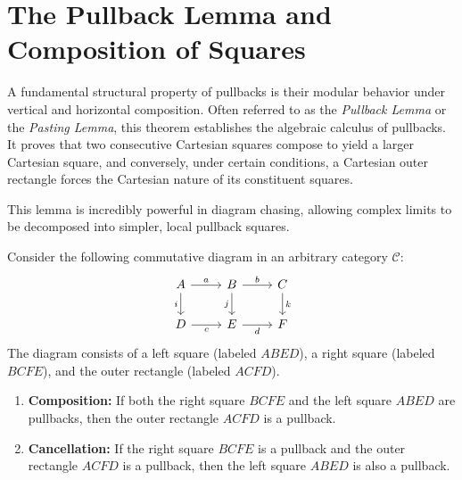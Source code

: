 \section{The Pullback Lemma and Composition of Squares}

A fundamental structural property of pullbacks is their modular behavior under vertical and horizontal composition. Often referred to as the \emph{Pullback Lemma} or the \emph{Pasting Lemma}, this theorem establishes the algebraic calculus of pullbacks. It proves that two consecutive Cartesian squares compose to yield a larger Cartesian square, and conversely, under certain conditions, a Cartesian outer rectangle forces the Cartesian nature of its constituent squares. 

This lemma is incredibly powerful in diagram chasing, allowing complex limits to be decomposed into simpler, local pullback squares.

\begin{theorem}
\label{thm:pasting_lemma}
Consider the following commutative diagram in an arbitrary category $\mathcal{C}$:
\begin{equation}
\label{eq:pasting_diagram}
\begin{tikzcd}
A \arrow[r, "a"] \arrow[d, "i"'] & B \arrow[r, "b"] \arrow[d, "j"'] & C \arrow[d, "k"] \\
D \arrow[r, "c"'] & E \arrow[r, "d"'] & F
\end{tikzcd}
\end{equation}
The diagram consists of a left square (labeled $ABED$), a right square (labeled $BCFE$), and the outer rectangle (labeled $ACFD$).
\begin{enumerate}
    \item \textbf{Composition:} If both the right square $BCFE$ and the left square $ABED$ are pullbacks, then the outer rectangle $ACFD$ is a pullback.
    \item \textbf{Cancellation:} If the right square $BCFE$ is a pullback and the outer rectangle $ACFD$ is a pullback, then the left square $ABED$ is also a pullback.
\end{enumerate}
\end{theorem}

